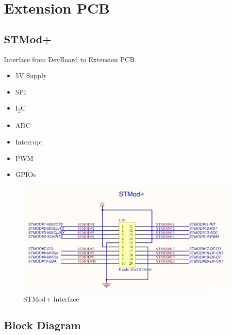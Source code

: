 \newpage


\section{Extension PCB}
\label{sec:Extension PCB}



\subsection{STMod+}
Interface from DevBoard to Extension PCB. 

\begin{itemize}
    \item 5V Supply
    \item SPI 
    \item I\textsubscript{2}C
    \item ADC
    \item Interrupt
    \item PWM
    \item GPIOs
\end{itemize}

\begin{figure}[H]
	\centering
	\includegraphics[width=13cm]{Resources/Pictures/STMOD_Interface.png}
	\caption{STMod+ Interface}
	\label{fig:STMod+ Interface}
\end{figure}






\subsection{Block Diagram}





